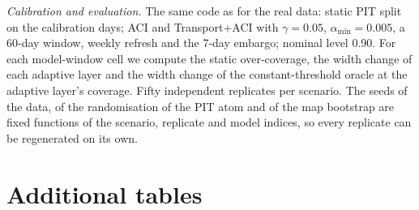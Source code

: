 \emph{Calibration and evaluation.} The same code as for the real data: static PIT split on the calibration days; ACI and Transport+ACI with $\gamma=0.05$, $\alpha_{\min}=0.005$, a 60-day window, weekly refresh and the 7-day embargo; nominal level 0.90. For each model-window cell we compute the static over-coverage, the width change of each adaptive layer and the width change of the constant-threshold oracle at the adaptive layer's coverage. Fifty independent replicates per scenario. The seeds of the data, of the randomisation of the PIT atom and of the map bootstrap are fixed functions of the scenario, replicate and model indices, so every replicate can be regenerated on its own.

\section{Additional tables}
\label{app:extra}


